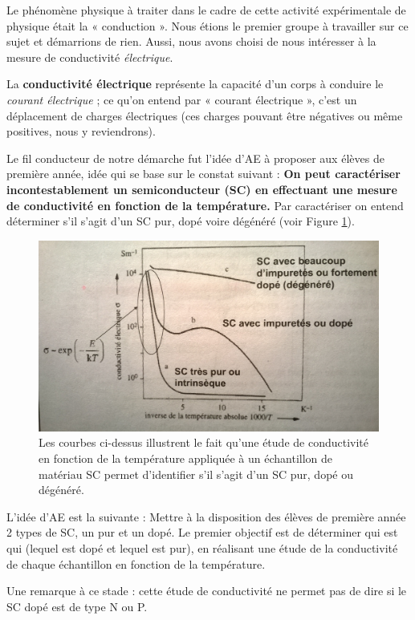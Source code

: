 Le phénomène physique à traiter dans le cadre de cette activité expérimentale de physique était la « conduction ». 
Nous étions le premier groupe à travailler sur ce sujet et démarrions de rien. 
Aussi, nous avons choisi de nous intéresser à la mesure de conductivité \textit{électrique}.

La \textbf{conductivité électrique} représente la capacité d'un corps à conduire le \textit{courant électrique} ; 
ce qu'on entend par « courant électrique », c'est un déplacement de charges électriques 
(ces charges pouvant être négatives ou même positives, nous y reviendrons).

\bigskip
Le fil conducteur de notre démarche fut l'idée d'AE à proposer aux élèves de première année, 
idée qui se base sur le constat suivant :
\textbf{On peut caractériser incontestablement un semiconducteur (SC) en effectuant 
une mesure de conductivité en fonction de la température.}
Par caractériser on entend déterminer s'il s'agit d'un SC pur, dopé voire dégénéré (voir Figure \ref{conduc}).

\begin{figure}
  \centering
  \includegraphics[width=12cm]{./images/conductivite.jpg}
  \caption{Les courbes ci-dessus illustrent le fait
  qu'une étude de conductivité en fonction de la température appliquée à un échantillon de matériau SC
  permet d'identifier s'il s'agit d'un SC pur, dopé ou dégénéré.}
  \label{conduc}
\end{figure}

\bigskip
L'idée d'AE est la suivante :
Mettre à la disposition des élèves de première année 2 types de SC, un pur et un dopé. 
Le premier objectif est de déterminer qui est qui (lequel est dopé et lequel est pur), 
en réalisant une étude de la conductivité de chaque échantillon 
en fonction de la température.

Une remarque à ce stade : cette étude de conductivité ne permet pas de dire si le SC dopé est de type N ou P.

